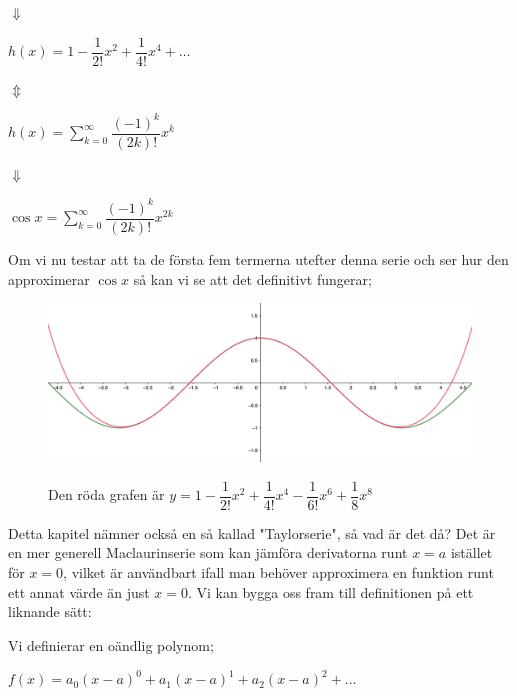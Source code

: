 \documentclass[10pt, a4paper]{amsart}
\begin{document}
\hspace{10ex}
$ \Downarrow $
\bigskip

\hspace{5ex}
$ h(x) = 1 - \dfrac{1}{2!}x^2 + \dfrac{1}{4!}x^4 + \dotso $ 
\bigskip

\hspace{10ex}
$ \Updownarrow $
\bigskip

\hspace{5ex}
$ h(x) = \sum\limits_{k=0}^{\infty} \dfrac{(-1)^k}{(2k)!}x^k $
\bigskip

\hspace{10ex}
$ \Downarrow $
\bigskip

\hspace{5ex}
$ \cos x = \sum\limits_{k=0}^{\infty} \dfrac{(-1)^k}{(2k)!}x^{2k} $
\vspace{24pt plus 4pt minus 4pt}

Om vi nu testar att ta de första fem termerna utefter denna serie och ser hur den approximerar $ \cos x $ så kan vi se att det definitivt fungerar;

\begin{figure}[ht!]
    \includegraphics[width=\linewidth]{photos/chapter1/4.png}
    \centerline{Den röda grafen är $ y = 1 - \dfrac{1}{2!}x^2 + \dfrac{1}{4!}x^4 - \dfrac{1}{6!}x^6 + \dfrac{1}{8}x^8$}
\end{figure}
\bigskip

Detta kapitel nämner också en så kallad "Taylorserie", så vad är det då? Det är en mer generell Maclaurinserie som kan jämföra derivatorna runt $ x = a $ istället för $ x = 0 $,
vilket är användbart ifall man behöver approximera en funktion runt ett annat värde än just $ x = 0 $. Vi kan bygga oss fram till definitionen på ett liknande sätt:
\bigskip

Vi definierar en oändlig polynom;
\bigskip

\bigskip
\hspace{5ex}
$ f(x) = a_0(x-a)^0 + a_1(x-a)^1 + a_2(x-a)^2 + \dotso $
\vspace{24pt plus 4pt minus 4pt}
\end{document}
